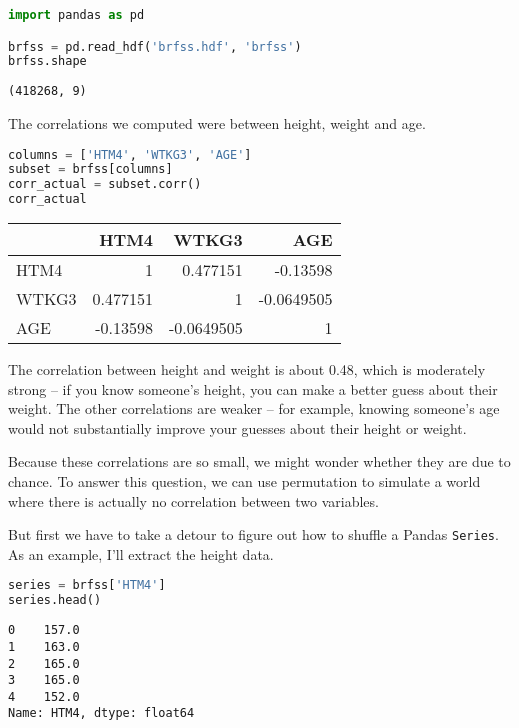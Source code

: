 \begin{lstlisting}[language=Python,style=source]
import pandas as pd

brfss = pd.read_hdf('brfss.hdf', 'brfss')
brfss.shape
\end{lstlisting}

\begin{lstlisting}[style=output]
(418268, 9)
\end{lstlisting}

The correlations we computed were between height, weight and age.

\begin{lstlisting}[language=Python,style=source]
columns = ['HTM4', 'WTKG3', 'AGE']
subset = brfss[columns]
corr_actual = subset.corr()
corr_actual
\end{lstlisting}

\begin{tabular}{lrrr}
\midrule
 & HTM4 & WTKG3 & AGE \\
\midrule
HTM4 & 1 & 0.477151 & -0.13598 \\
WTKG3 & 0.477151 & 1 & -0.0649505 \\
AGE & -0.13598 & -0.0649505 & 1 \\
\midrule
\end{tabular}

The correlation between height and weight is about 0.48, which is
moderately strong -- if you know someone's height, you can make a better
guess about their weight. The other correlations are weaker -- for
example, knowing someone's age would not substantially improve your
guesses about their height or weight.

Because these correlations are so small, we might wonder whether they
are due to chance. To answer this question, we can use permutation to
simulate a world where there is actually no correlation between two
variables.

But first we have to take a detour to figure out how to shuffle a Pandas
\passthrough{\lstinline!Series!}. As an example, I'll extract the height
data.

\begin{lstlisting}[language=Python,style=source]
series = brfss['HTM4']
series.head()
\end{lstlisting}

\begin{lstlisting}[style=output]
0    157.0
1    163.0
2    165.0
3    165.0
4    152.0
Name: HTM4, dtype: float64
\end{lstlisting}

